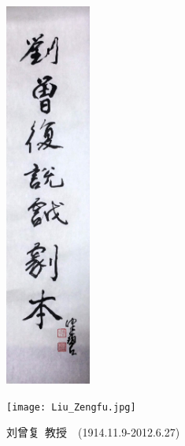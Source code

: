 \newpage
\pagestyle{empty}    %
\vskip -0.3in
\begin{figure}[h!]
\centering
\hspace*{4.5in}
\includegraphics[height=1.30\textwidth,width=0.25\textwidth,viewport=0 0 620 2850,clip]{Figures_Peking-Opera/Liu_script-Inscription.JPG}
\label{Chen-Peking_Opera_Script-Inscription-2015}
\end{figure}

\newpage
\pagestyle{empty}    %
\begin{figure}[h!]
\centering
\vspace{+0.2in}
\texttt{[image: Liu\_Zengfu.jpg]}
\caption*{\hei 刘曾复~教授~~(1914.11.9-2012.6.27)}
\label{Liu_Zengfu}
\end{figure}

